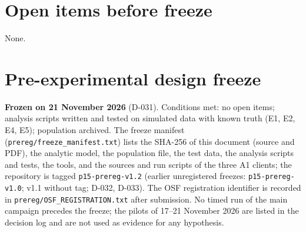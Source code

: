 \documentclass[11pt,a4paper]{article}
\begin{document}
\section{Open items before freeze}
None.

\section{Pre-experimental design freeze}\label{sec:freeze}
\textbf{Frozen on 21 November 2026} (D-031). Conditions met: no open items; analysis scripts written and tested on simulated data with known truth (E1, E2, E4, E5); population archived. The freeze manifest (\texttt{prereg/freeze\_manifest.txt}) lists the SHA-256 of this document (source and PDF), the analytic model, the population file, the test data, the analysis scripts and tests, the tools, and the sources and run scripts of the three A1 clients; the repository is tagged \texttt{p15-prereg-v1.2} (earlier unregistered freezes: \texttt{p15-prereg-v1.0}; v1.1 without tag; D-032, D-033). The OSF registration identifier is recorded in \texttt{prereg/OSF\_REGISTRATION.txt} after submission. No timed run of the main campaign precedes the freeze; the pilots of 17--21 November 2026 are listed in the decision log and are not used as evidence for any hypothesis.

\appendix
\end{document}
